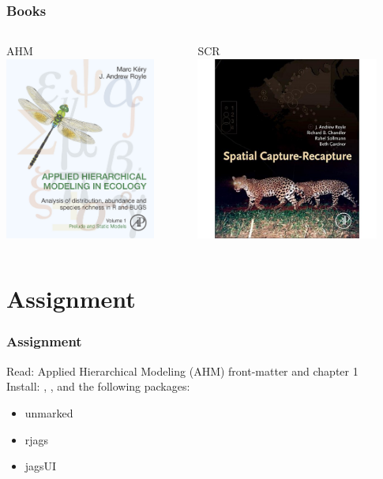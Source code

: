 \documentclass{beamer}\usepackage[]{graphicx}\usepackage[]{color}
\begin{document}
\begin{frame}
  \frametitle{Books}
  \begin{columns}[c]
    \begin{column}{0.5\textwidth}
      \centering
      AHM \\
      \includegraphics[height=6cm]{figs/KeryRoyleBookCover} \\
    \end{column}
    \hfill
    \begin{column}{0.5\textwidth}
      \centering
      SCR \\
      \includegraphics[height=6cm]{figs/SCRcover} \\
    \end{column}
  \end{columns}
\end{frame}



\section{Assignment}


\begin{frame}
  \frametitle{Assignment}
  \Large
  Read: Applied Hierarchical Modeling (AHM) front-matter and chapter 1 \\
  \vfill
  Install: \href{https://sourceforge.net/projects/mcmc-jags/files/}{\jags},
  \href{https://www.r-project.org/}{\R}, and the following packages:
  \begin{itemize}
    \tt
    \item unmarked
    \item rjags
    \item jagsUI
  \end{itemize}

\end{frame}
\end{document}
